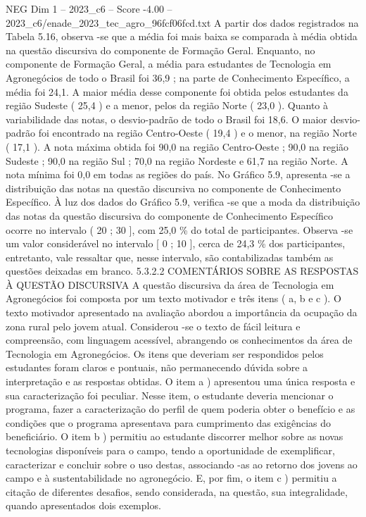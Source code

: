 \begin{textsample}{NEG Dim 1 – 2023\_c6 – Score -4.00 – 2023\_c6/enade\_2023\_tec\_agro\_96fcf06fcd.txt}
A partir dos dados registrados na Tabela 5.16, observa -se que a média foi mais baixa se comparada à média obtida na questão discursiva do componente de Formação Geral.
Enquanto, no componente de Formação Geral, a média para estudantes de Tecnologia em Agronegócios de todo o Brasil foi 36,9 ; na parte de Conhecimento Específico, a média foi 24,1.
A maior média desse componente foi obtida pelos estudantes da região Sudeste ( 25,4 ) e a menor, pelos da região Norte ( 23,0 ).
Quanto à variabilidade das notas, o desvio-padrão de todo o Brasil foi 18,6.
O maior desvio-padrão foi encontrado na região Centro-Oeste ( 19,4 ) e o menor, na região Norte ( 17,1 ).
A nota máxima obtida foi 90,0 na região Centro-Oeste ; 90,0 na região Sudeste ; 90,0 na região Sul ; 70,0 na região Nordeste e 61,7 na região Norte.
A nota mínima foi 0,0 em todas as regiões do país.
No Gráfico 5.9, apresenta -se a distribuição das notas na questão discursiva no componente de Conhecimento Específico.
À luz dos dados do Gráfico 5.9, verifica -se que a moda da distribuição das notas da questão discursiva do componente de Conhecimento Específico ocorre no intervalo ( 20 ; 30 ], com 25,0 \% do total de participantes.
Observa -se um valor considerável no intervalo [ 0 ; 10 ], cerca de 24,3 \% dos participantes, entretanto, vale ressaltar que, nesse intervalo, são contabilizadas também as questões deixadas em branco. 5.3.2.2 COMENTÁRIOS SOBRE AS RESPOSTAS À QUESTÃO DISCURSIVA A questão discursiva da área de Tecnologia em Agronegócios foi composta por um texto motivador e três itens ( a, b e c ).
O texto motivador apresentado na avaliação abordou a importância da ocupação da zona rural pelo jovem atual.
Considerou -se o texto de fácil leitura e compreensão, com linguagem acessível, abrangendo os conhecimentos da área de Tecnologia em Agronegócios.
Os itens que deveriam ser respondidos pelos estudantes foram claros e pontuais, não permanecendo dúvida sobre a interpretação e as respostas obtidas.
O item a ) apresentou uma única resposta e sua caracterização foi peculiar.
Nesse item, o estudante deveria mencionar o programa, fazer a caracterização do perfil de quem poderia obter o benefício e as condições que o programa apresentava para cumprimento das exigências do beneficiário.
O item b ) permitiu ao estudante discorrer melhor sobre as novas tecnologias disponíveis para o campo, tendo a oportunidade de exemplificar, caracterizar e concluir sobre o uso destas, associando -as ao retorno dos jovens ao campo e à sustentabilidade no agronegócio.
E, por fim, o item c ) permitiu a citação de diferentes desafios, sendo considerada, na questão, sua integralidade, quando apresentados dois exemplos.

\end{textsample}
